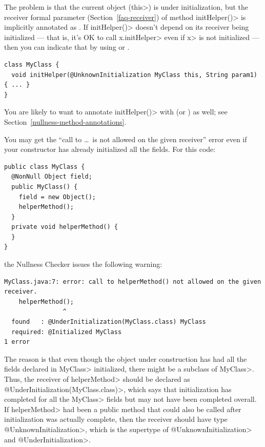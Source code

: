 The problem is that the current object (\<this>) is under initialization,
but the receiver formal parameter (Section~\ref{faq-receiver}) of method
\<initHelper()> is implicitly annotated as
.  If
\<initHelper()> doesn't depend on its receiver being initialized --- that
is, it's OK to call \<x.initHelper> even if \<x> is not initialized ---
then you can indicate that by using
 or
.

\begin{Verbatim}
class MyClass {
  void initHelper(@UnknownInitialization MyClass this, String param1) { ... }
}
\end{Verbatim}

\noindent
You are likely to want to annotate \<initHelper()> with
(or )
as well; see Section~\ref{nullness-method-annotations}.

You may get the ``call to \ldots\ is not allowed on the given receiver''
error even if your constructor has already initialized all the fields.
For this code:

\begin{Verbatim}
public class MyClass {
  @NonNull Object field;
  public MyClass() {
    field = new Object();
    helperMethod();
  }
  private void helperMethod() {
  }
}
\end{Verbatim}

\noindent
the Nullness Checker issues the following warning:

\begin{Verbatim}
MyClass.java:7: error: call to helperMethod() not allowed on the given receiver.
    helperMethod();
                ^
  found   : @UnderInitialization(MyClass.class) MyClass
  required: @Initialized MyClass
1 error
\end{Verbatim}

\begin{sloppypar}
The reason is that even though the object under construction has had all
the fields declared in \<MyClass> initialized, there might be a subclass of
\<MyClass>.  Thus, the receiver of \<helperMethod> should be declared as
\<@UnderInitialization(MyClass.class)>, which says that initialization has
completed for all the \<MyClass> fields but may not have been completed
overall.  If \<helperMethod> had been a public method that could also be called after
initialization was actually complete, then the receiver should have type
\<@UnknownInitialization>, which is the supertype of
\<@UnknownInitialization> and \<@UnderInitialization>.
\end{sloppypar}

